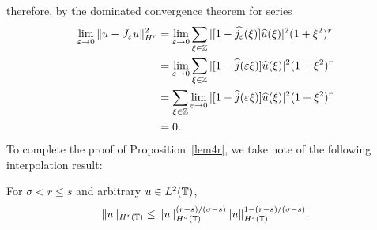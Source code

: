 therefore, by the dominated convergence theorem for series
\begin{equation}
\label{o1}
\begin{split}
\lim_{\varepsilon \to 0} \|u - J_\varepsilon u \|_{H^r }^2 
& = \lim_{\varepsilon \to 0} \sum_{\xi \in \mathbb{Z}} |[1-\widehat{j_\varepsilon}(\xi)]
\widehat{u}(\xi) |^2 (1 + \xi^2)^r
\\
& = \lim_{\varepsilon \to 0} \sum_{\xi \in \mathbb{Z}} |[1-\widehat{j}(\varepsilon \xi)]
\widehat{u}(\xi) |^2 (1 + \xi^2)^r
\\
& = \sum_{\xi \in \mathbb{Z}} \lim_{\varepsilon \to 0} |[1-\widehat{j}(\varepsilon \xi)]
\widehat{u}(\xi) |^2 (1 + \xi^2)^r
\\
& = 0.
\end{split}
\end{equation}
To complete the proof of Proposition~\ref{lem4r}, we take note of the following interpolation result:
\begin{remark}
\label{lem2r}
For $\sigma < r \le s$ and arbitrary $u \in L^2(\mathbb{T})$,
\begin{equation}
\begin{split}
\|u\|_{H^{r}(\mathbb{T})} \le
\|u\|_{H^\sigma(\mathbb{T})}^{(r-s)/(\sigma -s)}
\|u\|_{H^s(\mathbb{T})}^{1 - (r-s)/(\sigma -s)}.
\label{16u}
\end{split}
\end{equation}
\end{remark}
%
%
%
%

